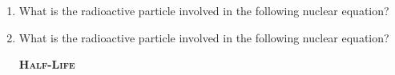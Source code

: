 \documentclass[main.tex]{subfiles}
\begin{document}
\begin{multicols*}{2}
\begin{enumerate}
\item What is the radioactive particle involved in the following nuclear equation? \\
\begin{center} \end{center} 
\begin{enumerate}[label=(\alph*)]
\end{enumerate}

\item What is the radioactive particle involved in the following nuclear equation? \\
\begin{center}  \end{center} 
\begin{enumerate}[label=(\alph*)]
\end{enumerate}

{\raggedright\textsc{\textbf{Half-Life }}\par}




\end{enumerate}
\end{multicols*}
\end{document}
